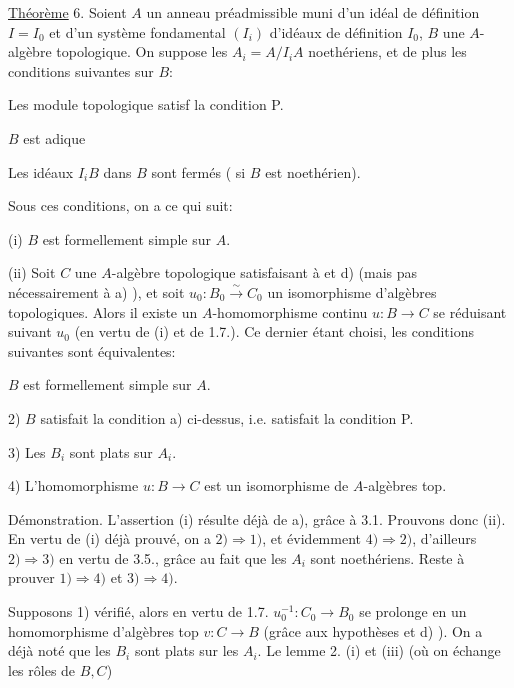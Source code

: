 
\uline{Théorème} 6. Soient $A$ un anneau préadmissible muni d'un idéal de
définition $I=I_0$ et d'un système fondamental $(I_i)$ d'idéaux de définition
$I_0$, $B$ une $A$-algèbre topologique. On suppose les $A_i=A/I_iA$ noethériens,
et de plus les conditions suivantes sur $B$:


 Les module topologique
 
 satisf la condition P.


 $B$ est adique 

 Les idéaux $I_iB$ dans $B$ sont fermés ( si $B$ est noethérien).

Sous ces conditions, on a ce qui suit:

(i) $B$ est formellement simple sur $A$.

(ii) Soit $C$ une $A$-algèbre topologique satisfaisant à  et d)
(mais pas nécessairement à a) ), et soit $u_0:B_0\xrightarrow{\sim}C_0$ un isomorphisme
d'algèbres topologiques. Alors il existe un $A$-homomorphisme continu
$u:B\longrightarrow C$ se réduisant suivant $u_0$ (en vertu de (i) et de 1.7.). Ce
dernier étant choisi, les conditions suivantes sont équivalentes: 

 $B$ est formellement simple sur $A$.

2)  $B$ satisfait la condition a) ci-dessus, i.e.  satisfait
la condition P.

3) Les $B_i$ sont plats sur $A_i$.

4) L'homomorphisme $u:B\longrightarrow C$ est un isomorphisme\deleted{\unsure{,}} de $A$-algèbres top.


Démonstration. L'assertion (i) résulte déjà de a), grâce à 3.1.
Prouvons donc (ii). En vertu de (i) déjà prouvé, on a $2)\Longrightarrow1)$, et
évidemment $4)\Longrightarrow2)$, d'ailleurs $2)\Longrightarrow3)$ en vertu de 3.5., grâce au
fait que les $A_i$ sont noethériens. Reste à prouver $1)\Longrightarrow4)$ et $3)\Longrightarrow4)$.

Supposons 1) vérifié, alors en vertu de 1.7. $u_0^{-1}:C_0\longrightarrow B_0$
se prolonge en un homomorphisme d'algèbres top $v:C\longrightarrow B$ (grâce aux
hypothèses  et d) ). On a déjà noté que les $B_i$ sont plats sur les
$A_i$. Le lemme 2. (i) et (iii) (où on échange les rôles de $B,C$)

